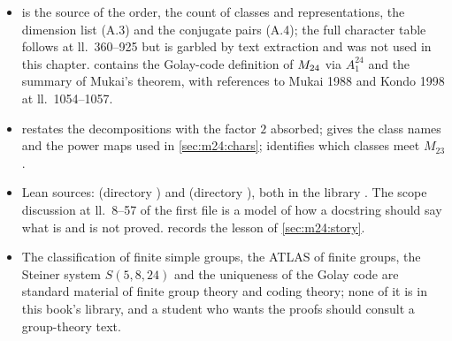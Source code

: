 \begin{itemize}[leftmargin=*,itemsep=2pt]
\item {} is the source of the order, the count of classes and
 representations, the dimension list (A.3) and the conjugate pairs (A.4); the full character
 table follows at ll.~360--925 but is garbled by text extraction and was not used in this
 chapter.  contains the Golay-code definition of $M_{24}$
 via $A_1^{24}$ and the summary of Mukai's theorem, with references to Mukai 1988 and
 Kondo 1998 at ll.~1054--1057.
\item {} restates the decompositions with the factor $2$
 absorbed;  gives the class names and the power maps
 used in \cref{sec:m24:chars};  identifies which classes meet
 $M_{23}$.
\item Lean sources:  (directory ) and
  (directory ), both in the library
 . The scope discussion at ll.~8--57 of the first file is a
 model of how a docstring should say what is and is not proved.  records the lesson of \cref{sec:m24:story}.
\item The classification of finite simple groups, the ATLAS of finite groups, the Steiner
 system $S(5,8,24)$ and the uniqueness of the Golay code are standard material of finite
 group theory and coding theory; none of it is in this book's library, and a student who
 wants the proofs should consult a group-theory text.
\end{itemize}
